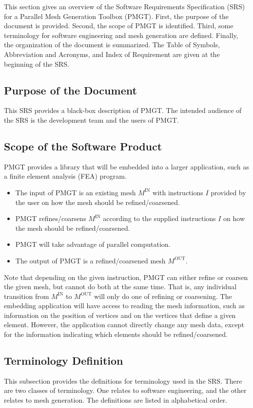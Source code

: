 \documentclass[12pt,titlepage]{article}
\begin{document}
This section gives an overview of the Software Requirements Specification (SRS) for a Parallel Mesh Generation Toolbox (PMGT). First, the purpose of the document is provided. Second, the scope of PMGT is identified. Third, some terminology for software engineering and mesh generation are defined. Finally, the organization of the document is summarized. The Table of Symbols, Abbreviation and Acronyms, and Index of Requirement are given at the beginning of the SRS.

\subsection{Purpose of the Document}
This SRS provides a black-box description of PMGT. The intended audience of the SRS is the development team and the users of PMGT.

\subsection{Scope of the Software Product}
PMGT provides a library that will be embedded into a larger application, such as a finite element analysis (FEA) program. 
\begin{itemize}
\item The input of PMGT is an existing mesh $M^{\mbox{IN}}$ with instructions $I$ provided by the user on how the mesh should be refined/coarsened.
\item PMGT refines/coarsens $M^{\mbox{IN}}$ according to the supplied instructions $I$ on how the mesh should be refined/coarsened.
\item PMGT will take advantage of parallel computation.
\item The output of PMGT is a refined/coarsened mesh $M^{\mbox{OUT}}$.
\end{itemize}
Note that depending on the given instruction, PMGT can either refine or coarsen the given mesh, but cannot do both at the same time. That is, any individual transition from $M^{\mbox{IN}}$ to $M^{\mbox{OUT}}$ will only do one of refining or coarsening. The embedding application will have access to reading the mesh information, such as information on the position of vertices and on the vertices that define a given element. However, the application cannot directly change any mesh data, except for the information indicating which elements should be refined/coarsened. 

\subsection{Terminology Definition}
This subsection provides the definitions for terminology used in the SRS. There are two classes of terminology. One relates to software engineering, and the other relates to mesh generation. The definitions are listed in alphabetical order.
\end{document}
